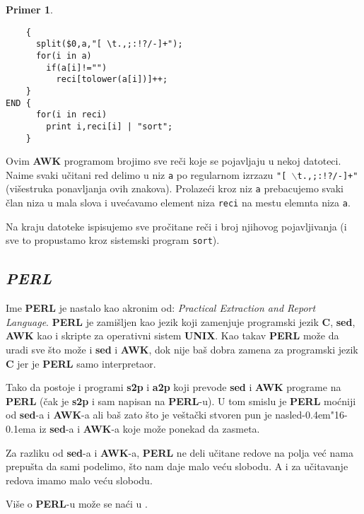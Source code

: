 \documentclass[12pt,a4paper]{article}
\def\d{d\kern-0.4em\char"16\kern-0.1em}
\def\bs{$\backslash$}
\newtheorem{primer}{Primer}[section]
\begin{document}
        \begin{primer}\ \label{primer:awk}\end{primer}
        \begin{verbatim}
    {
      split($0,a,"[ \t.,;:!?/-]+");
      for(i in a)
        if(a[i]!="")
          reci[tolower(a[i])]++;
    }
END {
      for(i in reci)
        print i,reci[i] | "sort";
    }
\end{verbatim}

        Ovim {\bf AWK} programom brojimo sve re\v ci koje se pojavljaju u
        nekoj datoteci.
        Naime svaki u\v citani red delimo u niz {\tt a} po regularnom izrzazu
        {\tt"[ \bs t.,;:!?/-]+"} (vi\v sestruka ponavljanja ovih znakova).
        Prolaze\'ci kroz niz {\tt a} prebacujemo svaki \v clan niza u mala
        slova i uve\'cavamo element niza {\tt reci} na mestu elemnta niza
        {\tt a}.

        Na kraju datoteke ispisujemo sve pro\v citane re\v ci i broj njihovog
        pojavlji\-vanja (i sve to propustamo kroz sistemski program
        {\tt sort}).
%
    \subsection{\em PERL}
      Ime {\bf PERL} je nastalo kao akronim od: {\em Practical Extraction and
      Report Language}.
      {\bf PERL} je zami\v sljen kao jezik koji zamenjuje programski jezik
      {\bf C}, {\bf sed}, {\bf AWK} kao i skripte za operativni sistem
      {\bf UNIX}.
      Kao takav {\bf PERL} mo\v ze da uradi sve \v sto mo\v ze i {\bf sed} i
      {\bf AWK},
      dok nije ba\v s dobra zamena za programski jezik {\bf C} jer je
      {\bf PERL} samo interpretaor.

      Tako da postoje i programi {\bf s2p} i {\bf a2p} koji prevode {\bf sed}
      i {\bf AWK} programe na {\bf PERL} (\v cak je {\bf s2p} i sam napisan na
      {\bf PERL}-u).
      U tom smislu je {\bf PERL} mo\'cniji od {\bf sed}-a i {\bf AWK}-a ali
      ba\v s zato \v sto je ve\v sta\v cki stvoren pun je nasle\d a iz
      {\bf sed}-a i {\bf AWK}-a koje mo\v ze ponekad da zasmeta.

      Za razliku od {\bf sed}-a i {\bf AWK}-a, {\bf PERL} ne deli u\v citane
      redove na polja ve\'c nama prepu\v sta da sami podelimo, \v sto nam daje
      malo ve\'cu slobodu.
      A i za u\v citavanje redova imamo malo ve\'cu slobodu.

      Vi\v se o {\bf PERL}-u mo\v ze se na\'ci u \cite{PERL}.
%
\end{document}
